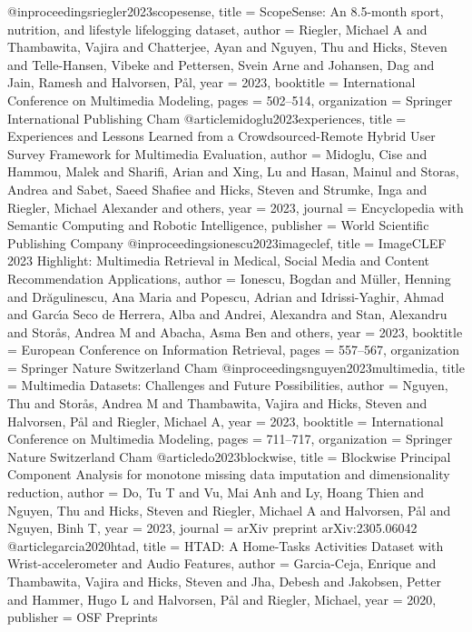 @inproceedings{riegler2023scopesense,
	title = {ScopeSense: An 8.5-month sport, nutrition, and lifestyle lifelogging dataset},
	author = {Riegler, Michael A and Thambawita, Vajira and Chatterjee, Ayan and Nguyen, Thu and Hicks, Steven and Telle-Hansen, Vibeke and Pettersen, Svein Arne and Johansen, Dag and Jain, Ramesh and Halvorsen, P{\aa}l},
	year = 2023,
	booktitle = {International Conference on Multimedia Modeling},
	pages = {502--514},
	organization = {Springer International Publishing Cham}
}
@article{midoglu2023experiences,
	title = {Experiences and Lessons Learned from a Crowdsourced-Remote Hybrid User Survey Framework for Multimedia Evaluation},
	author = {Midoglu, Cise and Hammou, Malek and Sharifi, Arian and Xing, Lu and Hasan, Mainul and Storas, Andrea and Sabet, Saeed Shafiee and Hicks, Steven and Strumke, Inga and Riegler, Michael Alexander and others},
	year = 2023,
	journal = {Encyclopedia with Semantic Computing and Robotic Intelligence},
	publisher = {World Scientific Publishing Company}
}
@inproceedings{ionescu2023imageclef,
	title = {ImageCLEF 2023 Highlight: Multimedia Retrieval in Medical, Social Media and Content Recommendation Applications},
	author = {Ionescu, Bogdan and M{\"u}ller, Henning and Dr{\u{a}}gulinescu, Ana Maria and Popescu, Adrian and Idrissi-Yaghir, Ahmad and Garc{\'\i}a Seco de Herrera, Alba and Andrei, Alexandra and Stan, Alexandru and Stor{\aa}s, Andrea M and Abacha, Asma Ben and others},
	year = 2023,
	booktitle = {European Conference on Information Retrieval},
	pages = {557--567},
	organization = {Springer Nature Switzerland Cham}
}
@inproceedings{nguyen2023multimedia,
	title = {Multimedia Datasets: Challenges and Future Possibilities},
	author = {Nguyen, Thu and Stor{\aa}s, Andrea M and Thambawita, Vajira and Hicks, Steven and Halvorsen, P{\aa}l and Riegler, Michael A},
	year = 2023,
	booktitle = {International Conference on Multimedia Modeling},
	pages = {711--717},
	organization = {Springer Nature Switzerland Cham}
}
@article{do2023blockwise,
	title = {Blockwise Principal Component Analysis for monotone missing data imputation and dimensionality reduction},
	author = {Do, Tu T and Vu, Mai Anh and Ly, Hoang Thien and Nguyen, Thu and Hicks, Steven and Riegler, Michael A and Halvorsen, P{\aa}l and Nguyen, Binh T},
	year = 2023,
	journal = {arXiv preprint arXiv:2305.06042}
}
@article{garcia2020htad,
	title = {HTAD: A Home-Tasks Activities Dataset with Wrist-accelerometer and Audio Features},
	author = {Garcia-Ceja, Enrique and Thambawita, Vajira and Hicks, Steven and Jha, Debesh and Jakobsen, Petter and Hammer, Hugo L and Halvorsen, P{\aa}l and Riegler, Michael},
	year = 2020,
	publisher = {OSF Preprints}
}
